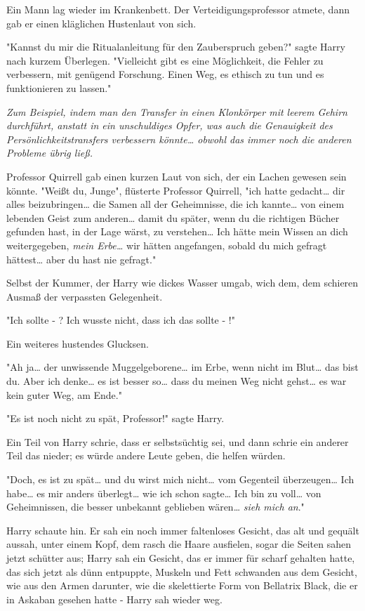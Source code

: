 {Ein Mann lag wieder im Krankenbett. Der Verteidigungsprofessor atmete, dann gab er einen kläglichen Hustenlaut von sich.

"Kannst du mir die Ritualanleitung für den Zauberspruch geben?" sagte Harry nach kurzem Überlegen. "Vielleicht gibt es eine Möglichkeit, die Fehler zu verbessern, mit genügend Forschung. Einen Weg, es ethisch zu tun und es funktionieren zu lassen."

\emph{Zum Beispiel, indem man den Transfer in einen Klonkörper mit leerem Gehirn durchführt, anstatt in ein unschuldiges Opfer, was auch die Genauigkeit des Persönlichkeitstransfers verbessern könnte… obwohl das immer noch die anderen Probleme übrig ließ.}

Professor Quirrell gab einen kurzen Laut von sich, der ein Lachen gewesen sein könnte. "Weißt du, Junge", flüsterte Professor Quirrell, "ich hatte gedacht… dir alles beizubringen… die Samen all der Geheimnisse, die ich kannte… von einem lebenden Geist zum anderen… damit du später, wenn du die richtigen Bücher gefunden hast, in der Lage wärst, zu verstehen… Ich hätte mein Wissen an dich weitergegeben, \emph{mein Erbe…} wir hätten angefangen, sobald du mich gefragt hättest… aber du hast nie gefragt."

Selbst der Kummer, der Harry wie dickes Wasser umgab, wich dem, dem schieren Ausmaß der verpassten Gelegenheit.

"Ich sollte - ? Ich wusste nicht, dass ich das sollte - !"

Ein weiteres hustendes Glucksen.

"Ah ja… der unwissende Muggelgeborene… im Erbe, wenn nicht im Blut… das bist du. Aber ich denke… es ist besser so… dass du meinen Weg nicht gehst… es war kein guter Weg, am Ende."

"Es ist noch nicht zu spät, Professor!" sagte Harry.

Ein Teil von Harry schrie, dass er selbstsüchtig sei, und dann schrie ein anderer Teil das nieder; es würde andere Leute geben, die helfen würden.

"Doch, es ist zu spät… und du wirst mich nicht… vom Gegenteil überzeugen… Ich habe… es mir anders überlegt… wie ich schon sagte… Ich bin zu voll… von Geheimnissen, die besser unbekannt geblieben wären… \emph{sieh mich an}."

Harry schaute hin. Er sah ein noch immer faltenloses Gesicht, das alt und gequält aussah, unter einem Kopf, dem rasch die Haare ausfielen, sogar die Seiten sahen jetzt schütter aus; Harry sah ein Gesicht, das er immer für scharf gehalten hatte, das sich jetzt als dünn entpuppte, Muskeln und Fett schwanden aus dem Gesicht, wie aus den Armen darunter, wie die skelettierte Form von Bellatrix Black, die er in Askaban gesehen hatte - Harry sah wieder weg.

}
